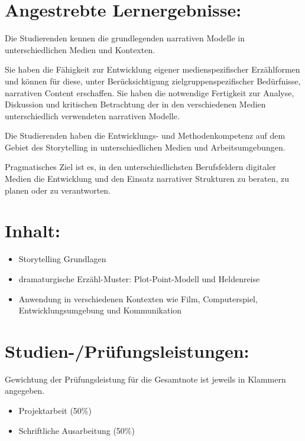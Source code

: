 \section*{Angestrebte
Lernergebnisse:}\label{angestrebte-lernergebnisse-17}

Die Studierenden kennen die grundlegenden narrativen Modelle in
unterschiedlichen Medien und Kontexten.

Sie haben die Fähigkeit zur Entwicklung eigener medienspezifischer
Erzählformen und können für diese, unter Berücksichtigung
zielgruppenspezifischer Bedürfnisse, narrativen Content erschaffen. Sie
haben die notwendige Fertigkeit zur Analyse, Diskussion und kritischen
Betrachtung der in den verschiedenen Medien unterschiedlich verwendeten
narrativen Modelle.

Die Studierenden haben die Entwicklungs- und Methodenkompetenz auf dem
Gebiet des Storytelling in unterschiedlichen Medien und
Arbeitsumgebungen.

Pragmatisches Ziel ist es, in den unterschiedlichsten Berufsfeldern
digitaler Medien die Entwicklung und den Einsatz narrativer Strukturen
zu beraten, zu planen oder zu verantworten.

\section*{Inhalt:}\label{inhalt-17}

\begin{itemize}
\tightlist
\item
  Storytelling Grundlagen
\item
  dramaturgische Erzähl-Muster: Plot-Point-Modell und Heldenreise
\item
  Anwendung in verschiedenen Kontexten wie Film, Computerspiel,
  Entwicklungsumgebung und Kommunikation
\end{itemize}

\section*{Studien-/Prüfungsleistungen:}\label{studien-pruxfcfungsleistungen-17}

Gewichtung der Prüfungsleistung für die Gesamtnote ist jeweils in
Klammern angegeben.

\begin{itemize}
\tightlist
\item
  Projektarbeit (50\%)
\item
  Schriftliche Ausarbeitung (50\%)
\end{itemize}

